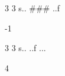
\begin{myverbbox}[\small]{\vinput}
3 3
s..
###
..f
\end{myverbbox}
\begin{myverbbox}[\small]{\voutput}
-1
\end{myverbbox}


\begin{myverbbox}[\small]{\vinput}
3 3
s..
..f
...
\end{myverbbox}
\begin{myverbbox}[\small]{\voutput}
4
\end{myverbbox}

